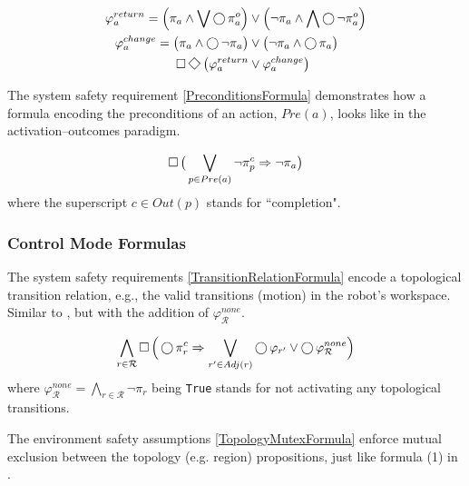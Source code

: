 \begin{subequations}
	\begin{align}
		\varphi_a^{return} = \Big( \pi_a \wedge \bigvee \LTLX \pi_a^o \Big) &\vee \Big( \lnot \pi_a \wedge \bigwedge \LTLX \lnot \pi_a^o \Big)\label{ActionFairnessConditionsFormula1}\\
		\varphi_a^{change} = \big( \pi_a \wedge \LTLX \lnot \pi_a \big) &\vee \big( \lnot \pi_a \wedge \LTLX \pi_a \big)\label{ActionFairnessConditionsFormula2}\\
		\LTLG \LTLF \big( \varphi_a^{return} &\vee \varphi_a^{change} \big)\label{ActionFairnessConditionsFormula}
	\end{align}
\end{subequations}

The system safety requirement \eqref{PreconditionsFormula} demonstrates how a formula encoding the preconditions of an action, $Pre(a)$, looks like in the activation--outcomes paradigm.

\begin{equation}\label{PreconditionsFormula}
	\operatorname{\Box} \big( \bigvee \limits_{p \in Pre(a)} \lnot \pi_p^c \Rightarrow \lnot \pi_a \big)
\end{equation}
where the superscript $c \in Out(p)$ stands for ``completion".


\subsubsection{Control Mode Formulas}

The system safety requirements \eqref{TransitionRelationFormula} encode a topological transition relation, e.g., the valid transitions (motion) in the robot's workspace. 
Similar to \cite{Vasu2013ICRA}, but with the addition of $\varphi_\mathcal{R}^{none}$.


\begin{equation}\label{TransitionRelationFormula}
	\bigwedge \limits_{r \in \mathcal{R}} \operatorname{\Box} \Big( \operatorname{\bigcirc} \pi_r^c \Rightarrow \bigvee \limits_{r^\prime \in Adj(r)} \operatorname{\bigcirc} \varphi_{r^\prime} \vee \operatorname{\bigcirc} \varphi_\mathcal{R}^{none} \Big)
\end{equation}
where $\varphi_\mathcal{R}^{none} = \bigwedge \limits_{r \in \mathcal{R}} \lnot \pi_r$ being \texttt{True} stands for not activating any topological transitions.

The environment safety assumptions \eqref{TopologyMutexFormula} enforce mutual exclusion between the topology (e.g. region) propositions, just like formula (1) in \cite{Vasu2013ICRA}.

